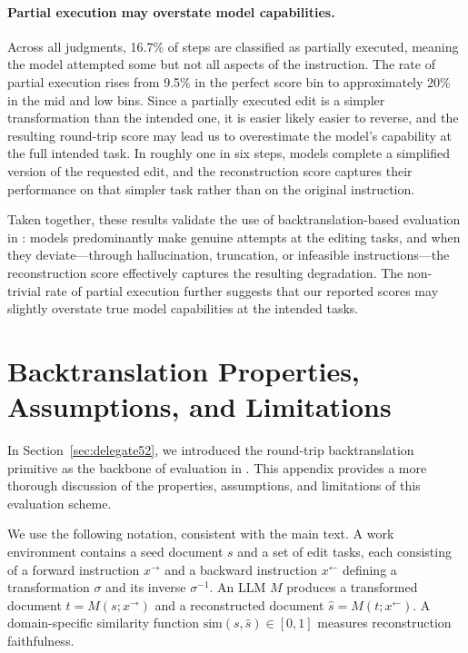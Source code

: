 \documentclass{article} %
\begin{document}
\paragraph{Partial execution may overstate model capabilities.} Across all judgments, 16.7\% of steps are classified as partially executed, meaning the model attempted some but not all aspects of the instruction. The rate of partial execution rises from 9.5\% in the perfect score bin to approximately 20\% in the mid and low bins. Since a partially executed edit is a simpler transformation than the intended one, it is easier likely easier to reverse, and the resulting round-trip score may lead us to overestimate the model's capability at the full intended task. In roughly one in six steps, models complete a simplified version of the requested edit, and the reconstruction score captures their performance on that simpler task rather than on the original instruction.

Taken together, these results validate the use of backtranslation-based evaluation in \benchmark{}: models predominantly make genuine attempts at the editing tasks, and when they deviate---through hallucination, truncation, or infeasible instructions---the reconstruction score effectively captures the resulting degradation. The non-trivial rate of partial execution further suggests that our reported scores may slightly overstate true model capabilities at the intended tasks.


\section{Backtranslation Properties, Assumptions, and Limitations} \label{app:backtranslation}

In Section~\ref{sec:delegate52}, we introduced the round-trip backtranslation primitive as the backbone of evaluation in \benchmark{}. This appendix provides a more thorough discussion of the properties, assumptions, and limitations of this evaluation scheme.

We use the following notation, consistent with the main text. A work environment contains a seed document $s$ and a set of edit tasks, each consisting of a forward instruction $x^{\rightarrow}$ and a backward instruction $x^{\leftarrow}$ defining a transformation $\sigma$ and its inverse $\sigma^{-1}$. An LLM $M$ produces a transformed document $t = M(s; x^{\rightarrow})$ and a reconstructed document $\hat{s} = M(t; x^{\leftarrow})$. A domain-specific similarity function $\mathrm{sim}(s, \hat{s}) \in [0, 1]$ measures reconstruction faithfulness.
\end{document}
